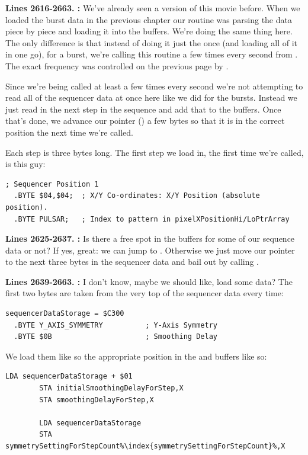 \textbf{Lines 2616-2663. :} We've already seen a version of this movie before. When we loaded the burst data in the previous chapter
our routine was parsing the data piece by piece and loading it into the buffers. We're doing the same thing here. The only difference is that instead of doing it just
the once (and loading all of it in one go), for a burst, we're calling this routine a few times every second from . The exact frequency was controlled on the previous page
by . 

Since we're being called at least a few times every second we're not attempting to read all of the sequencer data at once here like we did for the bursts. Instead we just read in the next step in
the sequence and add that to the buffers. Once that's done, we advance our pointer () a few bytes so that it is in the correct position the next time we're called.

Each step is three bytes long. The first step we load in, the first time we're called, is this guy:

\begin{lstlisting}[escapechar=\%]
  ; Sequencer Position 1
  .BYTE $04,$04;  ; X/Y Co-ordinates: X/Y Position (absolute position).   
  .BYTE PULSAR;   ; Index to pattern in pixelXPositionHi/LoPtrArray   
\end{lstlisting}

\textbf{Lines 2625-2637. :} Is there a free spot in the buffers for some of our sequence data or not? If yes, great: we can jump to .
Otherwise we just move our pointer  to the next three bytes in the sequencer data and bail out by calling . 

\textbf{Lines 2639-2663. :}  I don't know, maybe we should like, load some data? The first two bytes are taken from the very top of the sequencer data every time:
\begin{lstlisting}[escapechar=\%]
sequencerDataStorage = $C300
  .BYTE Y_AXIS_SYMMETRY          ; Y-Axis Symmetry
  .BYTE $0B                      ; Smoothing Delay
\end{lstlisting}
We load them like so the appropriate position in the  and  buffers like so:
\begin{lstlisting}[escapechar=\%]
        LDA sequencerDataStorage + $01
        STA initialSmoothingDelayForStep,X
        STA smoothingDelayForStep,X

        LDA sequencerDataStorage
        STA symmetrySettingForStepCount%\index{symmetrySettingForStepCount}%,X
\end{lstlisting}


